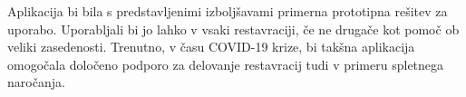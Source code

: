 \documentclass[a4paper, 12pt]{book}
\begin{document}
Aplikacija bi bila s predstavljenimi izboljšavami primerna prototipna rešitev za uporabo. Uporabljali bi jo lahko v vsaki restavraciji, če ne drugače kot pomoč ob veliki zasedenosti. Trenutno, v času COVID-19 krize, bi takšna aplikacija omogočala določeno podporo za delovanje restavracij tudi v primeru spletnega naročanja.


\newpage %
\ \\
\clearpage
{}


\end{document}
